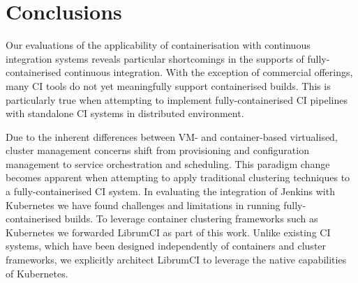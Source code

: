 \documentclass{report}
\begin{document}
\section{Conclusions}
Our evaluations of the applicability of containerisation with continuous integration systems reveals 
particular shortcomings in the supports of fully-containerised continuous integration.
With the exception of commercial offerings, many CI tools do not yet meaningfully 
support containerised builds. This is particularly true when attempting to
implement fully-containerised CI pipelines with standalone CI systems
in distributed environment. 
\par
Due to the inherent differences between VM- and container-based virtualised,
cluster management concerns shift from provisioning and configuration management
to service orchestration and scheduling. This paradigm change becomes apparent 
when attempting to apply traditional clustering techniques to a fully-containerised CI system.
In evaluating the integration of Jenkins with Kubernetes we have found
challenges and limitations in running fully-containerised builds. To leverage 
container clustering frameworks such as Kubernetes we forwarded LibrumCI as part of this work.
Unlike existing CI systems, which have been designed independently of containers and cluster frameworks,
we explicitly architect LibrumCI to leverage the native capabilities of Kubernetes.



\vspace{-7.5mm}
\renewcommand{\refname}{\section{References}}


\end{document}
